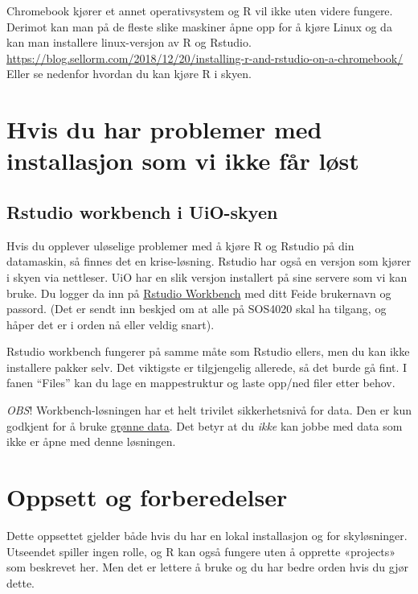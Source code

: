 \documentclass[
  norsk,
  letterpaper,
  DIV=11,
  numbers=noendperiod]{scrreprt}
\theoremstyle{definition}
\theoremstyle{remark}
\begin{document}
Chromebook kjører et annet operativsystem og R vil ikke uten videre
fungere. Derimot kan man på de fleste slike maskiner åpne opp for å
kjøre Linux og da kan man installere linux-versjon av R og Rstudio.
\url{https://blog.sellorm.com/2018/12/20/installing-r-and-rstudio-on-a-chromebook/}
Eller se nedenfor hvordan du kan kjøre R i skyen.

\section{Hvis du har problemer med installasjon som vi ikke får
løst}\label{hvis-du-har-problemer-med-installasjon-som-vi-ikke-fuxe5r-luxf8st}

\subsection{Rstudio workbench i
UiO-skyen}\label{rstudio-workbench-i-uio-skyen}

Hvis du opplever uløselige problemer med å kjøre R og Rstudio på din
datamaskin, så finnes det en krise-løsning. Rstudio har også en versjon
som kjører i skyen via nettleser. UiO har en slik versjon installert på
sine servere som vi kan bruke. Du logger da inn på
\href{https://rstudio-workbench.uio.no/}{Rstudio Workbench} med ditt
Feide brukernavn og passord. (Det er sendt inn beskjed om at alle på
SOS4020 skal ha tilgang, og håper det er i orden nå eller veldig snart).

Rstudio workbench fungerer på samme måte som Rstudio ellers, men du kan
ikke installere pakker selv. Det viktigste er tilgjengelig allerede, så
det burde gå fint. I fanen ``Files'' kan du lage en mappestruktur og
laste opp/ned filer etter behov.

\emph{OBS}! Workbench-løsningen har et helt trivilet sikkerhetsnivå for
data. Den er kun godkjent for å bruke
\href{https://www.uio.no/tjenester/it/sikkerhet/lsis/tillegg/lagring/infoklasser.html}{grønne
data}. Det betyr at du \emph{ikke} kan jobbe med data som ikke er åpne
med denne løsningen.

\section{Oppsett og forberedelser}\label{oppsett-og-forberedelser}

Dette oppsettet gjelder både hvis du har en lokal installasjon og for
skyløsninger. Utseendet spiller ingen rolle, og R kan også fungere uten
å opprette «projects» som beskrevet her. Men det er lettere å bruke og
du har bedre orden hvis du gjør dette.
\end{document}
